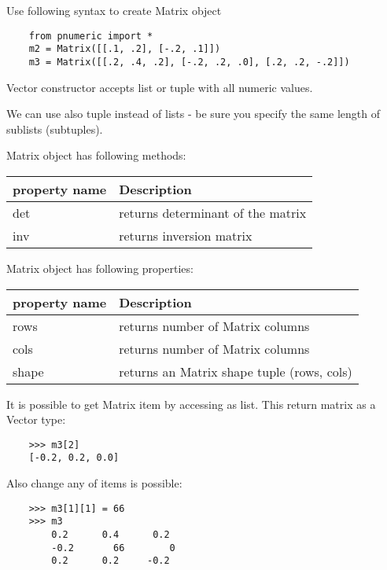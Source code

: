 \documentclass{article}
\begin{document}
    Use following syntax to create Matrix object
    
    \begin{verbatim}
    from pnumeric import *
    m2 = Matrix([[.1, .2], [-.2, .1]])
    m3 = Matrix([[.2, .4, .2], [-.2, .2, .0], [.2, .2, -.2]])
    \end{verbatim}
    Vector constructor accepts list or tuple with all numeric values.
    
    We can use also tuple instead of lists - be sure you specify the same 
    length of sublists (subtuples).

    Matrix object has following methods:
    
    \begin{tabular}{|l|l|} \hline
    \textbf{property name} & \textbf{Description} \\ \hline
    det      & returns determinant of the matrix \\
    inv      & returns inversion matrix \\
    \end{tabular}
    
    Matrix object has following properties:
    
    \begin{tabular}{|l|l|} \hline
    \textbf{property name} & \textbf{Description} \\ \hline
    rows      & returns number of Matrix columns \\
    cols      & returns number of Matrix columns \\
    shape     & returns an Matrix shape tuple (rows, cols) \\
    \end{tabular}

    It is possible to get Matrix item by accessing as list. This
    return matrix as a Vector type:
    
    \begin{verbatim}
    >>> m3[2]
    [-0.2, 0.2, 0.0]
    \end{verbatim}
    
    Also change any of items is possible:
    
    \begin{verbatim}
    >>> m3[1][1] = 66
    >>> m3
        0.2      0.4      0.2
        -0.2       66        0
        0.2      0.2     -0.2
    \end{verbatim}
\end{document}
